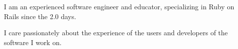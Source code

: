 
\cvparagraph
I am an experienced software engineer and educator, specializing in Ruby on Rails since the 2.0 days.

\cvparagraph
I care passionately about the experience of the users and developers of the software I work on.

